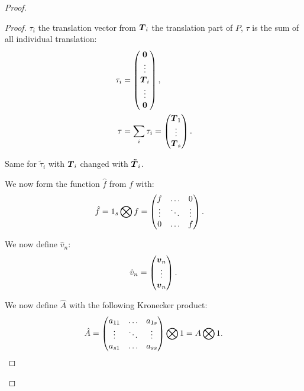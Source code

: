 \begin{proof}
\begin{proof}
$\tau_{i}$ the translation vector from ${\boldsymbol {T}}_i$ the translation part of $P$,
$\tau$ is the sum of all individual translation:
\begin{align}
	\tau_i&=\begin{pmatrix}
			{\boldsymbol {0}}\\
			\vdots\\
			{\boldsymbol {T}}_{i}\\
			\vdots\\
			{\boldsymbol {0}}\\
	\end{pmatrix}
	,\\
	\tau&=\sum_{i}\tau_{i}=\begin{pmatrix}
			{\boldsymbol {T}}_{1}\\
			\vdots\\
			{\boldsymbol {T}}_{s}\\
	\end{pmatrix}.
\end{align}

Same for $\tilde{\tau}_{i}$ with ${\boldsymbol {T}}_{i}$ changed with ${\boldsymbol {\tilde{T}}}_i$.

We now form the function $\hat{f}$ from $f$ with:
\begin{align}
\hat{f}&=1_{s}\bigotimes f=\begin{pmatrix}f	&\ldots	&0\\
			\vdots &\ddots 	&\vdots\\
			0	&\ldots	&f\\
	\end{pmatrix}.
\end{align}

We now define $\hat{v}_n$:
\begin{equation}
\hat{v}_{n}=\begin{pmatrix}
	      {\boldsymbol {v}}_{n}\\
	      \vdots\\
	      {\boldsymbol {v}}_{n}
	      \end{pmatrix}.
\end{equation}

We now define $\hat{A}$ with the following Kronecker product:
\begin{equation}
\hat{A}=\begin{pmatrix}
    a_{11}	&\ldots	&a_{1s}\\
    \vdots	&\ddots	&\vdots\\
    a_{s1}	&\ldots	&a_{ss}\\
  \end{pmatrix} \bigotimes 1=A \bigotimes 1.
\end{equation}


\end{proof}
\end{proof}
